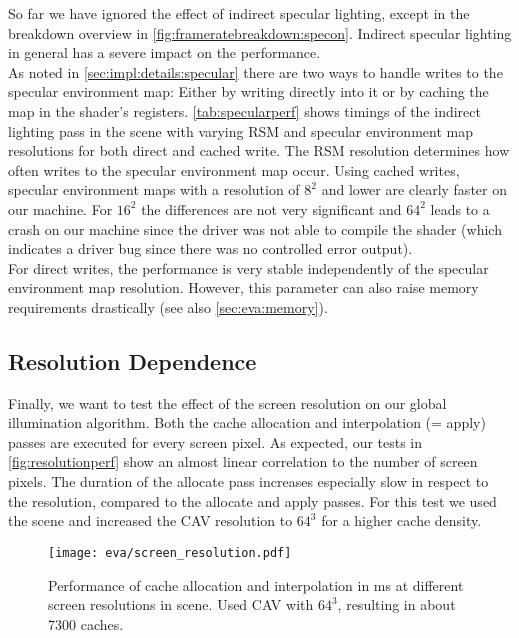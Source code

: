 \documentclass[thesis.tex]{subfiles}
\begin{document}
So far we have ignored the effect of indirect specular lighting, except in the breakdown overview in \autoref{fig:frameratebreakdown:specon}.
Indirect specular lighting in general has a severe impact on the performance.
\\
As noted in \autoref{sec:impl:details:specular} there are two ways to handle writes to the specular environment map:
Either by writing directly into it or by caching the map in the shader's registers.
\autoref{tab:specularperf} shows timings of the indirect lighting pass in the  scene with varying RSM and specular environment map resolutions for both direct and cached write.
The RSM resolution determines how often writes to the specular environment map occur.
Using cached writes, specular environment maps with a resolution of $8^2$ and lower are clearly faster on our machine.
For $16^2$ the differences are not very significant and $64^2$ leads to a crash on our machine since the driver was not able to compile the shader (which indicates a driver bug since there was no controlled error output).
\\
For direct writes, the performance is very stable independently of the specular environment map resolution.
However, this parameter can also raise memory requirements drastically (see also \autoref{sec:eva:memory}).

\subsection{Resolution Dependence}
Finally, we want to test the effect of the screen resolution on our global illumination algorithm.
Both the cache allocation and interpolation (= apply) passes are executed for every screen pixel.
As expected, our tests in \autoref{fig:resolutionperf} show an almost linear correlation to the number of screen pixels.
The duration of the allocate pass increases especially slow in respect to the resolution, compared to the allocate and apply passes.
For this test we used the  scene and increased the CAV resolution to $64^3$ for a higher cache density.
\begin{figure}[h!]
\centering
\texttt{[image: eva/screen\_resolution.pdf]}
\caption{Performance of cache allocation and interpolation in \si{\milli\second} at different screen resolutions in  scene. Used CAV with $64^3$, resulting in about 7300 caches.}
\label{fig:resolutionperf}
\end{figure}
\end{document}
